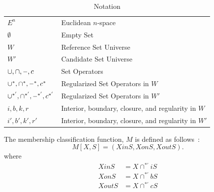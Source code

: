 \documentclass[a4paper,11pt,oneside]{article}
\newcommand{\minus}{\scalebox{0.9}[1.0]{$-$}} %
\begin{document}
\begin{table}
	\caption{Notation}
	\label{table:notations}
	\begin{tabularx}{\textwidth}{p{}X}
		\toprule
		$E^n$                                       & Euclidean $n$-space                                 \\
		$\emptyset$                                 & Empty Set                                           \\
		$W$                                         & Reference Set Universe                              \\
		$W'$                                        & Candidate Set Universe                              \\
		$\cup, \cap, \minus, c$                     & Set Operators                                       \\
		$\cup^*, \cap^*, \minus^*, c^*$             & Regularized Set Operators in $W$                    \\
		$\cup^{*'}, \cap^{*'}, \minus^{*'}, c^{*'}$ & Regularized Set Operators in $W'$                   \\
		$i, b, k, r$                                & Interior, boundary, closure, and regularity in $W$  \\
		$i', b', k', r'$                            & Interior, boundary, closure, and regularity in $W'$ \\
		\bottomrule
	\end{tabularx}
\end{table}

\begin{definition}
	The membership classification function, $M$ is defined as follows~\cite{tilove1977a}:
	\begin{equation}
		M[X, S] = (XinS, XonS, XoutS).
	\end{equation}
	where
	\begin{align*}
		XinS  & = X \cap^{*'} iS \\
		XonS  & = X \cap^{*'} bS \\
		XoutS & = X \cap^{*'} cS 
	\end{align*}
\end{definition}
\end{document}
